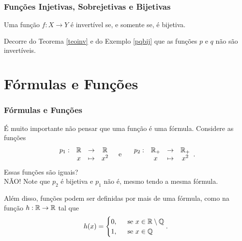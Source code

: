 \documentclass[brazil, notheorems, 10pt]{beamer}
\begin{document}
\begin{frame}
\frametitle{Funções Injetivas, Sobrejetivas e Bijetivas} %

\begin{Teo}\label{teoinv}
Uma função $f: X \to Y$ é invertível se, e somente se, é bijetiva.
\end{Teo}\pause

\begin{Exem}
Decorre do Teorema \ref{teoinv} e do Exemplo \ref{pqbij} que as
funções $p$ e $q$ não são invertíveis.
\end{Exem}

\end{frame}



\section{Fórmulas e Funções}
\begin{frame}
\frametitle{Fórmulas e Funções} %
É muito importante não pensar que uma função é uma fórmula.
Considere as funções
$$\begin{array}{cccc}
p_1 : & \mathbb{R} & \to     & \mathbb{R} \\
		 &  x & \mapsto & x^2
\end{array}
\text{\ \ \  e \ \ \ }
\begin{array}{cccc}
p_2 : & \mathbb{R}_+ & \to     & \mathbb{R}_+ \\
		 &  x & \mapsto &  x^2
\end{array}.$$
Essas funções são iguais? \\ \pause NÃO! Note que $p_2$ é bijetiva e
$p_1$ não é, mesmo tendo a mesma fórmula.

Além disso, funções podem ser definidas por mais de uma fórmula,
como na função $h :  \mathbb{R}  \to      \mathbb{R}$ tal que
		 $$h(x) =  \begin{cases}
						0, &  \ \text{ se } x \in \mathbb{R} \setminus \mathbb{Q} \\
						1, & \ \text{ se } x \in \mathbb{Q}
						\end{cases} .$$
\end{frame}



\end{document}
